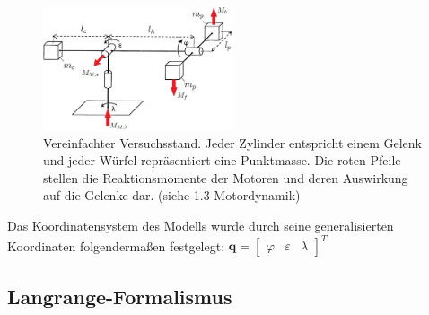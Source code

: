 \documentclass[10pt,twocolumn]{article}
\begin{document}
	\begin{figure}[ht]
		\centering
		\includegraphics[width=0.5\textwidth]{images/setup_mom}
		\caption{Vereinfachter Versuchsstand. Jeder Zylinder entspricht einem Gelenk und jeder Würfel repräsentiert eine Punktmasse. Die roten Pfeile stellen die Reaktionsmomente der Motoren und deren Auswirkung auf die Gelenke dar. (siehe 1.3 Motordynamik) }
		\label{setup}
	\end{figure}
	Das Koordinatensystem des Modells wurde durch seine generalisierten Koordinaten folgendermaßen festgelegt: $\bm q = \begin{bmatrix}
	\varphi & \varepsilon & \lambda
	\end{bmatrix}^T $
	
	\subsection{Langrange-Formalismus}
	
\end{document}
